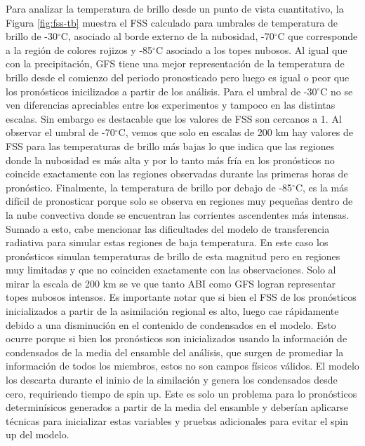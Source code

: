 \documentclass[12pt,oneside,a4paper]{reedthesis}
\begin{document}
Para analizar la temperatura de brillo desde un punto de vista cuantitativo, la Figura \ref{fig:fss-tb} muestra el FSS calculado para umbrales de temperatura de brillo de -30\(^\circ\)C, asociado al borde externo de la nubosidad, -70\(^\circ\)C que corresponde a la región de colores rojizos y -85\(^\circ\)C asociado a los topes nubosos. Al igual que con la precipitación, GFS tiene una mejor representación de la temperatura de brillo desde el comienzo del periodo pronosticado pero luego es igual o peor que los pronósticos inicilizados a partir de los análisis. Para el umbral de -30\(^\circ\)C no se ven diferencias apreciables entre los experimentos y tampoco en las distintas escalas. Sin embargo es destacable que los valores de FSS son cercanos a 1. Al observar el umbral de -70\(^\circ\)C, vemos que solo en escalas de 200 km hay valores de FSS para las temperaturas de brillo más bajas lo que indica que las regiones donde la nubosidad es más alta y por lo tanto más fría en los pronósticos no coincide exactamente con las regiones observadas durante las primeras horas de pronóstico. Finalmente, la temperatura de brillo por debajo de -85\(^\circ\)C, es la más difícil de pronosticar porque solo se observa en regiones muy pequeñas dentro de la nube convectiva donde se encuentran las corrientes ascendentes más intensas. Sumado a esto, cabe mencionar las dificultades del modelo de transferencia radiativa para simular estas regiones de baja temperatura. En este caso los pronósticos simulan temperaturas de brillo de esta magnitud pero en regiones muy limitadas y que no coinciden exactamente con las observaciones. Solo al mirar la escala de 200 km se ve que tanto ABI como GFS logran representar topes nubosos intensos. Es importante notar que si bien el FSS de los pronósticos inicializados a partir de la asimilación regional es alto, luego cae rápidamente debido a una disminución en el contenido de condensados en el modelo. Esto ocurre porque si bien los pronósticos son inicializados usando la información de condensados de la media del ensamble del análisis, que surgen de promediar la información de todos los miembros, estos no son campos físicos válidos. El modelo los descarta durante el ininio de la similación y genera los condensados desde cero, requiriendo tiempo de spin up. Este es solo un problema para lo pronósticos determinísicos generados a partir de la media del ensamble y deberían aplicarse técnicas para inicializar estas variables y pruebas adicionales para evitar el spin up del modelo.
\end{document}

